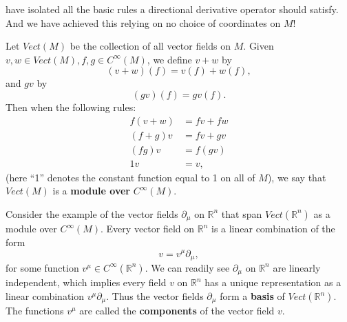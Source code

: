 \documentclass[a4paper,11pt]{article}
\theoremstyle{remark}
\begin{document}
have isolated all the basic rules a directional derivative operator
should satisfy. And we have achieved this relying on no choice of
coordinates on $M$!\par
Let $Vect(M)$ be the collection of all vector fields on $M$. Given $v,
w \in Vect(M), f, g \in C^{\infty}(M)$, we define $v+w$ by $$(v+w)(f) =
v(f) + w(f),$$ and $g v$ by $$(g v)(f) = g v(f).$$ Then when the
following rules:
\begin{align*}
  f(v + w) &= f v + f w\\
  (f + g)v &= f v + g v\\
  (f g)v &= f(g v)\\
  1 v &= v,
\end{align*}
(here ``1'' denotes the constant function equal to 1 on all of $M$),
we say that $Vect(M)$ is a \textbf{module over} $C^{\infty}(M)$.\par
Consider the example of the vector fields ${\partial_\mu}$ on
$\mathbb{R}^n$ that span $Vect(\mathbb{R}^n)$ as a module over
$C^{\infty}(M)$. Every vector field on $\mathbb{R}^n$ is a linear
combination of the form $$v = v^{\mu} \partial_{\mu},$$ for some
function $v^{\mu} \in C^{\infty}(\mathbb{R}^n)$. We can readily see
${\partial_{\mu}}$ on $\mathbb{R}^n$ are linearly independent, which
implies every field $v$ on $\mathbb{R}^n$ has a unique representation
as a linear combination $v^{\mu} \partial_{\mu}$. Thus the vector
fields ${\partial_{\mu}}$ form a \textbf{basis} of
$Vect(\mathbb{R}^n)$. The functions $v^{\mu}$ are called the
\textbf{components} of the vector field $v$.
\end{document}
